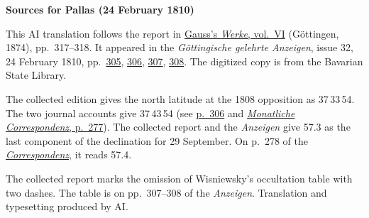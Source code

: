 \clearpage\thispagestyle{empty}
\begin{center}\textbf{Sources for Pallas (24 February 1810)}\end{center}
\noindent This AI translation follows the report in \href{https://gdz.sub.uni-goettingen.de/id/PPN236007467}{Gauss’s \textit{Werke}, vol.~VI} (Göttingen, 1874), pp.~317--318. It appeared in the \textit{Göttingische gelehrte Anzeigen}, issue 32, 24 February 1810, pp.~\href{https://api.digitale-sammlungen.de/iiif/image/v2/bsb10538677_00341/full/1600,/0/default.jpg}{305}, \href{https://api.digitale-sammlungen.de/iiif/image/v2/bsb10538677_00342/full/1600,/0/default.jpg}{306}, \href{https://api.digitale-sammlungen.de/iiif/image/v2/bsb10538677_00343/full/1600,/0/default.jpg}{307}, \href{https://api.digitale-sammlungen.de/iiif/image/v2/bsb10538677_00344/full/1600,/0/default.jpg}{308}. The digitized copy is from the Bavarian State Library.
\par\smallskip\noindent The collected edition gives the north latitude at the 1808 opposition as 37\,33\,54. The two journal accounts give 37\,43\,54 (see \href{https://api.digitale-sammlungen.de/iiif/image/v2/bsb10538677_00342/full/1600,/0/default.jpg}{p.~306} and \href{https://api.digitale-sammlungen.de/iiif/image/v2/bsb10538611_00285/full/1600,/0/default.jpg}{\textit{Monatliche Correspondenz}, p.~277}). The collected report and the \textit{Anzeigen} give 57.3 as the last component of the declination for 29 September. On p.~278 of the \href{https://api.digitale-sammlungen.de/iiif/image/v2/bsb10538611_00286/full/1600,/0/default.jpg}{\textit{Correspondenz}}, it reads 57.4.
\par\smallskip\noindent The collected report marks the omission of Wisniewsky’s occultation table with two dashes. The table is on pp.~307--308 of the \textit{Anzeigen}. Translation and typesetting produced by AI.
\clearpage
